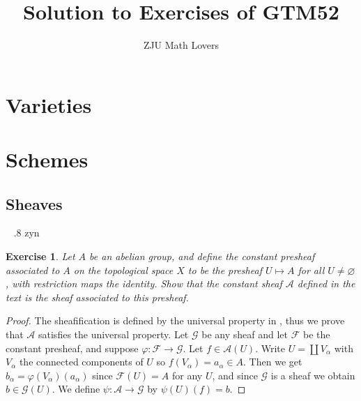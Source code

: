 \documentclass{amsart}
\title{Solution to Exercises of GTM52}
\date{}
\author{ZJU Math Lovers}
\newtheorem{exe}{Exercise}[subsection]
\theoremstyle{remark}\newtheorem{rmk}[theorem]{Remark}
\begin{document}
\maketitle
\tableofcontents
\section{Varieties}
\section{Schemes}

\subsection{Sheaves}
\ \newline
{}.8 zyn
\begin{exe}
Let $A$ be an abelian group, and define the constant presheaf associated to $A$ on the topological space $X$ to be the presheaf $U \mapsto A$ for all $U \neq \varnothing$, with restriction maps the identity. Show that the constant sheaf $\mathscr{A}$ defined in the text is the sheaf associated to this presheaf.
\end{exe}  
\begin{proof}
The sheafification is defined by the universal property in \cite{HAR},  thus we prove that $\mathscr{A}$ satisfies the universal property.  Let $\mathscr{G}$ be any sheaf and let $\mathscr{F}$ be the constant presheaf, and suppose $\varphi: \mathscr{F} \rightarrow \mathscr{G}$.  Let $f \in \mathscr{A}(U)$.  Write $U=\coprod V_{\alpha}$ with $V_{\alpha}$ the connected components of $U$ so $f(V_{\alpha})=a_{\alpha} \in A .$ Then we get $b_{\alpha}=\varphi(V_{\alpha})(a_{\alpha})$ since $\mathscr{F}(U)=A$ for any $U$,  and since $\mathscr{G}$ is a sheaf we obtain $b \in \mathscr{G}(U)$.  We define $\psi: \mathscr{A} \rightarrow \mathscr{G}$ by $\psi(U)(f)=b$.
\end{proof}
\end{document}
